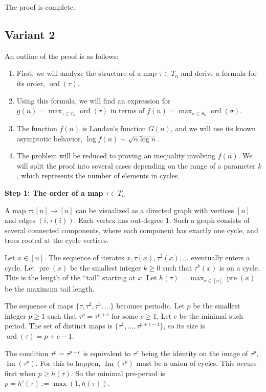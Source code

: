 \documentclass[12pt,a4paper]{article}
\theoremstyle{definition}
\begin{document}
        The proof is complete.

\subsection{Variant 2}
    An outline of the proof is as follows:
    \begin{enumerate}
        \item First, we will analyze the structure of a map $\tau \in T_n$ and derive a formula for its order, $\operatorname{ord}(\tau)$.
        \item Using this formula, we will find an expression for $g(n) = \max_{\tau \in T_n} \operatorname{ord}(\tau)$ in terms of $f(n) = \max_{\sigma \in S_n} \operatorname{ord}(\sigma)$.
        \item The function $f(n)$ is Landau's function $G(n)$, and we will use its known asymptotic behavior, $\log f(n) \sim \sqrt{n \log n}$.
        \item The problem will be reduced to proving an inequality involving $f(n)$. We will split the proof into several cases depending on the range of a parameter $k$, which represents the number of elements in cycles.
    \end{enumerate}

    \textbf{Step 1: The order of a map $\tau \in T_n$}

    A map $\tau: [n] \to [n]$ can be visualized as a directed graph with vertices $[n]$ and edges $(i, \tau(i))$. Each vertex has out-degree 1. Such a graph consists of several connected components, where each component has exactly one cycle, and trees rooted at the cycle vertices.

    Let $x \in [n]$. The sequence of iterates $x, \tau(x), \tau^2(x), \ldots$ eventually enters a cycle. Let $\operatorname{pre}(x)$ be the smallest integer $k \geq 0$ such that $\tau^k(x)$ is on a cycle. This is the length of the ``tail'' starting at $x$. Let $h(\tau) = \max_{x \in [n]} \operatorname{pre}(x)$ be the maximum tail length.

    The sequence of maps $\{\tau, \tau^2, \tau^3, \ldots\}$ becomes periodic. Let $p$ be the smallest integer $p \geq 1$ such that $\tau^p = \tau^{p+c}$ for some $c \geq 1$. Let $c$ be the minimal such period. The set of distinct maps is $\{\tau^1, \ldots, \tau^{p+c-1}\}$, so its size is $\operatorname{ord}(\tau) = p+c-1$.

    The condition $\tau^p = \tau^{p+c}$ is equivalent to $\tau^c$ being the identity on the image of $\tau^p$, $\operatorname{Im}(\tau^p)$. For this to happen, $\operatorname{Im}(\tau^p)$ must be a union of cycles. This occurs first when $p \geq h(\tau)$. So the minimal pre-period is $p = h'(\tau) := \max(1, h(\tau))$.
\end{document}

